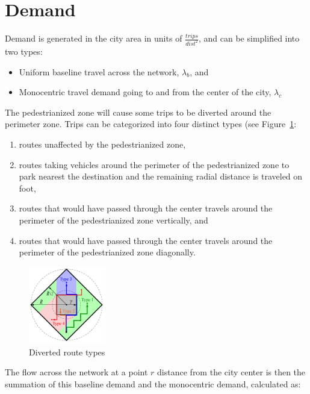 \documentclass{article}
\begin{document}
\section{Demand}
Demand is generated in the city area in units of $\frac{trips}{dist^2}$, and can be simplified into two types: 

\begin{itemize}[topsep=3pt, itemsep=3pt, partopsep=3pt, parsep=3pt]
    \item Uniform baseline travel across the network, $\lambda_b$, and
    \item Monocentric travel demand going to and from the center of the city, $\lambda_c$
\end{itemize}

\noindent The pedestrianized zone will cause some trips to be diverted around the perimeter zone. Trips can be categorized into four distinct types (see Figure~\ref{fig:diverted}:

\begin{enumerate}
	\item routes unaffected by the pedestrianized zone,
	\item routes taking vehicles around the perimeter of the pedestrianized zone to park nearest the destination and the remaining radial distance is traveled on foot,
	\item routes that would have passed through the center travels around the perimeter of the pedestrianized zone vertically, and
	\item routes that would have passed through the center travels around the perimeter of the pedestrianized zone diagonally.
\end{enumerate}

\begin{figure}[!ht]
     \centering
     \includegraphics[width=0.3\textwidth]{diagram_diverted_routes}
     \caption{Diverted route types}
     \label{fig:diverted}
\end{figure}

\noindent The flow across the network at a point $r$ distance from the city center is then the summation of this baseline demand and the monocentric demand, calculated as:
\end{document}
